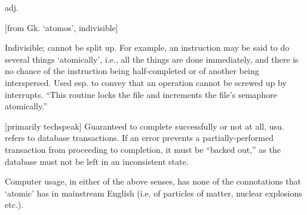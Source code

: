  adj.

[from Gk. `atomos', indivisible]
\begin{inparaenum}
	\item Indivisible; cannot be split up. For example, an instruction may be
		said to do several things `atomically', i.e., all the things are done
		immediately, and there is no chance of the instruction being
		half-completed or of another being interspersed. Used esp. to convey
		that an operation cannot be screwed up by interrupts. ``This routine
		locks the file and increments the file's semaphore atomically.''

	\item {[}primarily techspeak] Guaranteed to complete successfully or not at
		all, usu. refers to database transactions. If an error prevents a
		partially-performed transaction from proceeding to completion, it must
		be ``backed out,'' as the database must not be left in an inconsistent
		state.
\end{inparaenum}

Computer usage, in either of the above senses, has none of the connotations
that `atomic' has in mainstream English (i.e. of particles of matter, nuclear
explosions etc.).

